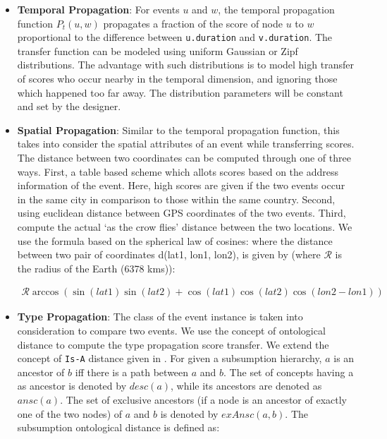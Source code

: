\begin{itemize}
\item \textbf{Temporal Propagation}: For events $u$ and $w$, the temporal propagation function $P_t (u, w)$ propagates a fraction of the score of node $u$ to $w$ proportional to the difference between \texttt{u.duration} and \texttt{v.duration}. The transfer function can be modeled using uniform Gaussian or Zipf distributions. The advantage with such distributions is to model high transfer of scores who occur nearby in the temporal dimension, and ignoring those which happened too far away. The distribution parameters will be constant and set by the designer.

\item \textbf{Spatial Propagation}: Similar to the temporal propagation function, this takes into consider the spatial attributes of an event while transferring scores. The distance between two coordinates can be computed through one of three ways. First, a table based scheme which allots scores based on the address information of the event. Here, high scores are given if the two events occur in the same city in comparison to those within the same country. Second, using euclidean distance between GPS coordinates of the two events. Third, compute the actual `as the crow flies' distance between the two locations. We use the formula based on the spherical law of cosines: where the distance between two pair of coordinates d(lat1, lon1, lon2), is given by (where $\mathcal R$ is the radius of the Earth (6378 kms)):


\begin{align}
\label{eq:distance}
\mathcal R \arccos(\sin(lat1) \sin(lat2) + \cos(lat1) \cos(lat2) \cos(lon2 - lon1))
\end{align}


\item \textbf{Type Propagation}: The class of the event instance is taken into consideration to compare two events. We use the concept of ontological distance to compute the type propagation score transfer. We extend the concept of \texttt{Is-A} distance given in \cite{ranwez2006ontological}. For given a subsumption hierarchy, $a$ is an ancestor of $b$ iff there is a path between $a$ and $b$. The set of concepts having a as ancestor is denoted by $desc(a)$, while its ancestors are denoted as $ansc(a)$. The set of exclusive ancestors (if a node is an ancestor of exactly one of the two nodes) of $a$ and $b$ is denoted by $exAnsc(a, b)$. The subsumption ontological distance is defined as:


\end{itemize}
